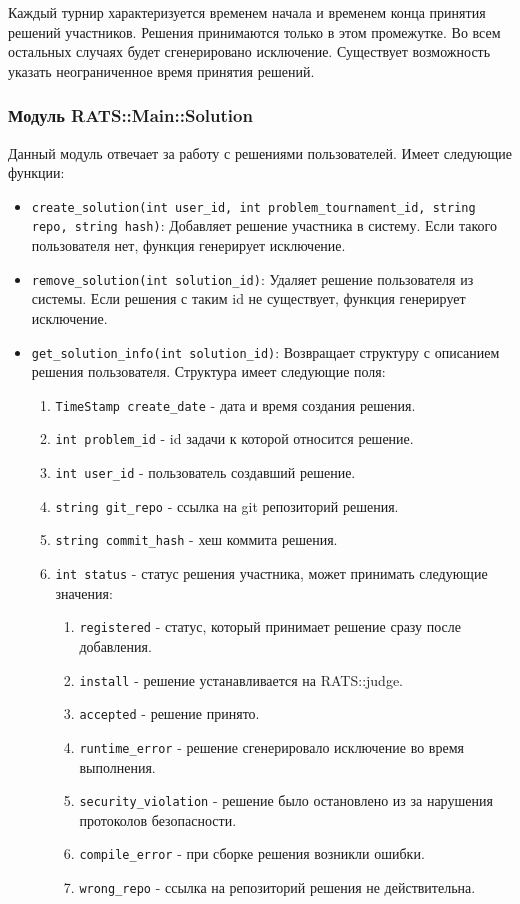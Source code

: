 \documentclass[a4paper,12pt]{article}
\begin{document}
Каждый турнир характеризуется временем начала и временем конца принятия решений участников. Решения принимаются только в этом промежутке. Во всем остальных случаях будет сгенерировано исключение. Существует возможность указать неограниченное время принятия решений.

\subsubsection{Модуль RATS::Main::Solution}
Данный модуль отвечает за работу с решениями пользователей. Имеет следующие функции:

\begin{itemize}
    \item \verb+create_solution(int user_id, int problem_tournament_id, string repo, string hash)+: Добавляет решение участника в систему. Если такого пользователя нет, функция генерирует исключение.
    \item \verb+remove_solution(int solution_id)+: Удаляет решение пользователя из системы. Если решения с таким id не существует, функция генерирует исключение.
    \item \verb+get_solution_info(int solution_id)+: Возвращает структуру с описанием решения пользователя. Структура имеет следующие поля:
    \begin{enumerate}
        \item \verb+TimeStamp сreate_date+ - дата и время создания решения.
        \item \verb+int problem_id+ - id задачи к которой относится решение.
        \item \verb+int user_id+ - пользователь создавший решение.
        \item \verb+string git_repo+ - ссылка на git репозиторий решения.
        \item \verb+string commit_hash+ - хеш коммита решения.
        \item \verb+int status+ - статус решения участника, может принимать следующие значения:
        \begin{enumerate}
            \item \verb+registered+ - статус, который принимает решение сразу после добавления.
            \item \verb+install+ - решение устанавливается на RATS::judge. 
            \item \verb+accepted+ - решение принято.
            \item \verb+runtime_error+ - решение сгенерировало исключение во время выполнения.
            \item \verb+security_violation+ - решение было остановлено из за нарушения протоколов безопасности.
            \item \verb+compile_error+ - при сборке решения возникли ошибки.
            \item \verb+wrong_repo+ - ссылка на репозиторий решения не действительна.
        \end{enumerate}
    \end{enumerate}
\end{itemize}
\end{document}
